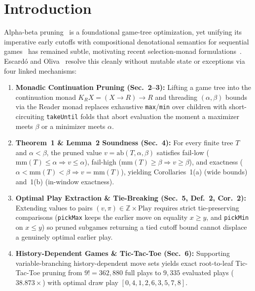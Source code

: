 \documentclass[10pt,twocolumn]{article}
\begin{document}
\section{Introduction}\label{sec:intro}
Alpha-beta pruning~\cite{hart1961tree,knuth1975analysis} is a foundational game-tree optimization, yet unifying its imperative early cutoffs with compositional denotational semantics for sequential games~\cite{escardo2010selection,escardo2011sequential,escardo2023higher} has remained subtle, motivating recent selection-monad formulations~\cite{hartmann2025selection,hartmann2026alphabeta}. Escard{\'o} and Oliva~\cite{escardo2026alphabeta} resolve this cleanly without mutable state or exceptions via four linked mechanisms:
\begin{enumerate}[leftmargin=*,nosep]
  \item \textbf{Monadic Continuation Pruning (Sec.~2--3):} Lifting a game tree into the continuation monad $K_R X = (X \to R) \to R$ and threading $(\alpha,\beta)$ bounds via the Reader monad replaces exhaustive \texttt{max}/\texttt{min} over children with short-circuiting \texttt{takeUntil} folds that abort evaluation the moment a maximizer meets $\beta$ or a minimizer meets $\alpha$.
  \item \textbf{Theorem~1 \& Lemma~2 Soundness (Sec.~4):} For every finite tree $T$ and $\alpha < \beta$, the pruned value $v = \mathrm{ab}(T, \alpha, \beta)$ satisfies fail-low ($\mathrm{mm}(T) \le \alpha \Rightarrow v \le \alpha$), fail-high ($\mathrm{mm}(T) \ge \beta \Rightarrow v \ge \beta$), and exactness ($\alpha < \mathrm{mm}(T) < \beta \Rightarrow v = \mathrm{mm}(T)$), yielding Corollaries~1(a) (wide bounds) and~1(b) (in-window exactness).
  \item \textbf{Optimal Play Extraction \& Tie-Breaking (Sec.~5, Def.~2, Cor.~2):} Extending values to pairs $(v, \pi) \in \mathbb{Z} \times \mathrm{Play}$ requires strict tie-preserving comparisons (\texttt{pickMax} keeps the earlier move on equality $x \ge y$, and \texttt{pickMin} on $x \le y$) so pruned subgames returning a tied cutoff bound cannot displace a genuinely optimal earlier play.
  \item \textbf{History-Dependent Games \& Tic-Tac-Toe (Sec.~6):} Supporting variable-branching history-dependent move sets yields exact root-to-leaf Tic-Tac-Toe pruning from $9! = 362{,}880$ full plays to $9{,}335$ evaluated plays ($38.873\times$) with optimal draw play $[0,4,1,2,6,3,5,7,8]$.
\end{enumerate}
\end{document}
